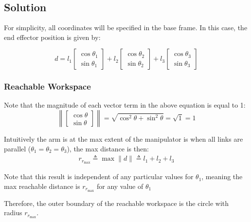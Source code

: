 \documentclass[11pt]{article}
\begin{document}
\subsection{Solution}
\label{sec:orgcea8194}
For simplicity, all coordinates will be specified in the base frame.
In this case, the end effector position is given by:

\begin{equation*}
d
=
l_1
\begin{bmatrix}
\cos{\theta_1} \\ \sin{\theta_1}
\end{bmatrix}
+
l_2
\begin{bmatrix}
\cos{\theta_2} \\ \sin{\theta_2}
\end{bmatrix}
+
l_3
\begin{bmatrix}
\cos{\theta_3} \\ \sin{\theta_3}
\end{bmatrix}
\end{equation*}

\subsubsection{Reachable Workspace}
\label{sec:org9a2e392}

Note that the magnitude of each vector term in the above equation is equal to 1:
\begin{equation*}
\left\|
\begin{bmatrix}
\cos{\theta} \\ \sin{\theta}
\end{bmatrix}
\right\|
=
\sqrt{
    \cos^2{\theta} + \sin^2{\theta}
}
=
\sqrt{1}
=
1
\end{equation*}

Intuitively the arm is at the max extent of the manipulator is when all links are parallel (\(\theta_1 = \theta_2 = \theta_3\)), the max distance is then:
\begin{align*}
r_{r_\text{max}}
\triangleq
\max{\|d\|}
\triangleq
l_1 + l_2 + l_3
\end{align*}

Note that this result is independent of any particular values for \(\theta_1\), meaning the max reachable distance is \(r_{r_\text{max}}\) for any value of \(\theta_1\)

Therefore, the outer boundary of the reachable workspace is the circle with radius \(r_{r_\text{max}}\).
\end{document}

